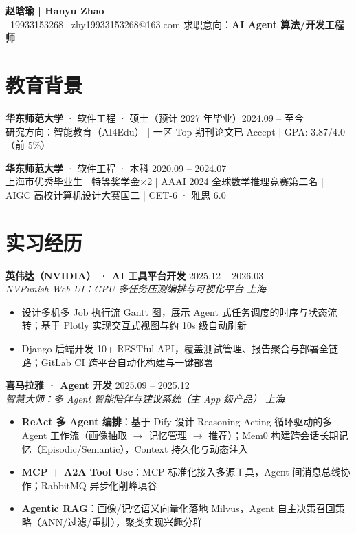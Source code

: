 \documentclass[10pt,a4paper]{article}
\newcommand{\expentry}[4]{%
  \noindent\textbf{#1} \hfill #4 \\[-3pt]
  \textit{#3} \hfill \textit{#2} \vspace{0pt}
}
\begin{document}
\begin{center}
  {\Large\bfseries 赵晗瑜 \;|\; Hanyu Zhao} \\[4pt]
  {\small
    \faPhone\ 19933153268 \quad
    \faEnvelope\ zhy19933153268@163.com \quad
    求职意向：\textbf{AI Agent 算法/开发工程师}
  }
\end{center}

\vspace{-8pt}

\section{教育背景}

\noindent\textbf{华东师范大学} · 软件工程 · 硕士（预计 2027 年毕业）\hfill 2024.09 -- 至今 \\[-2pt]
{\small 研究方向：智能教育（AI4Edu） | 一区 Top 期刊论文已 Accept | GPA: 3.87/4.0（前 5\%）}

\vspace{1pt}

\noindent\textbf{华东师范大学} · 软件工程 · 本科 \hfill 2020.09 -- 2024.07 \\[-2pt]
{\small 上海市优秀毕业生 | 特等奖学金$\times$2 | AAAI 2024 全球数学推理竞赛第二名 | AIGC 高校计算机设计大赛国二 | CET-6 · 雅思 6.0}

\section{实习经历}

\expentry{英伟达（NVIDIA） · AI 工具平台开发}{上海}{NVPunish Web UI：GPU 多任务压测编排与可视化平台}{2025.12 -- 2026.03}
\begin{itemize}
  \item 设计多机多 Job 执行流 Gantt 图，展示 Agent 式任务调度的时序与状态流转；基于 Plotly 实现交互式视图与约 10s 级自动刷新
  \item Django 后端开发 10+ RESTful API，覆盖测试管理、报告聚合与部署全链路；GitLab CI 跨平台自动化构建与一键部署
\end{itemize}

\vspace{1pt}

\expentry{喜马拉雅 · Agent 开发}{上海}{智慧大师：多 Agent 智能陪伴与建议系统（主 App 级产品）}{2025.09 -- 2025.12}
\begin{itemize}
  \item \textbf{ReAct 多 Agent 编排}：基于 Dify 设计 Reasoning-Acting 循环驱动的多 Agent 工作流（画像抽取 $\to$ 记忆管理 $\to$ 推荐）；Mem0 构建跨会话长期记忆（Episodic/Semantic），Context 持久化与动态注入
  \item \textbf{MCP + A2A Tool Use}：MCP 标准化接入多源工具，Agent 间消息总线协作；RabbitMQ 异步化削峰填谷
  \item \textbf{Agentic RAG}：画像/记忆语义向量化落地 Milvus，Agent 自主决策召回策略（ANN/过滤/重排），聚类实现兴趣分群
\end{itemize}
\end{document}
